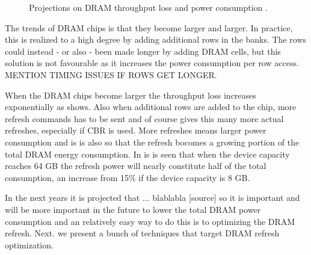 \begin{figure}[t]
    \centering
    \caption{Projections on DRAM throughput loss and power consumption \cite{raidr}.}
    \label{fig:dram_data_proj}
\end{figure}


The trends of DRAM chips is that they become larger and larger. In practice, this is realized to a high degree by adding additional rows in the banks. The rows could instead - or also - been made longer by adding DRAM cells, but this solution is not favourable as it increases the power consumption per row access. MENTION TIMING ISSUES IF ROWS GET LONGER.

When the DRAM chips become larger the throughput loss increases exponentially as  shows. Also when additional rows are added to the chip, more refresh commands has to be sent and of course gives this many more actual refreshes, especially if CBR is used. More refreshes means larger power consumption and is is also so that the refresh bocomes a growing portion of the total DRAM energy consumption. In  is is seen that when the device capacity reaches 64 GB the refresh power will nearly constitute half of the total consumption, an increase from 15\% if the device capacity is 8 GB. 

In the next years it is projected that ... blablabla [source] so it is important and will be more important in the future to lower the total DRAM power consumption and an relatively easy way to do this is to optimizing the DRAM refresh. Next. we present a bunch of techniques that target DRAM refresh optimization.
